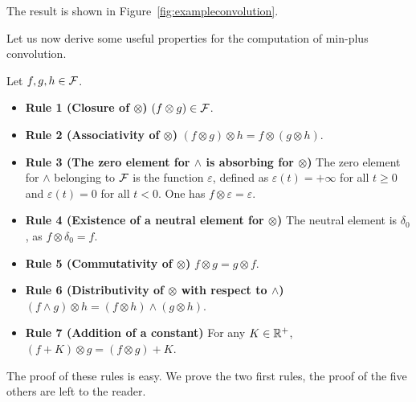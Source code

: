 The result is shown in Figure~\ref{fig:exampleconvolution}.
\begin{figure}[!htbp]
\end{figure}
Let us now derive some useful properties for the computation of min-plus convolution.
\begin{theorem}
Let $f, g, h \in \mathcal F$.
\begin{itemize}
\item{\textbf{Rule 1 (Closure of $\otimes$)}
$(f \otimes g) \in \mathcal F$.}
\item{\textbf{Rule 2 (Associativity of $\otimes$)}
$(f \otimes g) \otimes h =  f \otimes (g \otimes h)$.}
\item{ \textbf{Rule 3 (The zero element for $\wedge$ is absorbing for $\otimes$)}
The zero element for $\wedge$ belonging to $\mathcal F$ is the function $\varepsilon$, defined as
$\varepsilon(t) = +\infty$ for all $t \geq 0$ and $\varepsilon(t) = 0$ for all $t < 0$.
One has $f \otimes \varepsilon = \varepsilon$.}
\item{ \textbf{Rule 4 (Existence of a neutral element for $\otimes$)}
The neutral element is $\delta_0$, as $f \otimes \delta_0 = f$.}
\item{ \textbf{Rule 5 (Commutativity of $\otimes$)} $f \otimes g = g \otimes f$.}
\item{ \textbf{Rule 6 (Distributivity of $\otimes$ with respect to $\wedge$)}
$(f \wedge g) \otimes h =  (f \otimes h) \wedge (g \otimes h)$. }
\item{ \textbf{Rule 7 (Addition of a constant)} For any $K \in \mathbb{R}^{+}$,
$(f + K) \otimes g =  (f \otimes g) + K$. }
\end{itemize}
\end{theorem}
The proof of these rules is easy. We prove the two first rules, the proof of the five others are
left to the reader.
